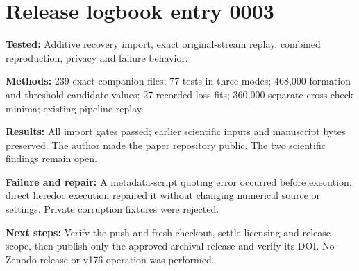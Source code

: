 \section*{Release logbook entry 0003}
\textbf{Tested:} Additive recovery import, exact original-stream replay, combined reproduction, privacy and failure behavior.

\textbf{Methods:} 239 exact companion files; 77 tests in three modes; 468,000 formation and threshold candidate values; 27 recorded-loss fits; 360,000 separate cross-check minima; existing pipeline replay.

\textbf{Results:} All import gates passed; earlier scientific inputs and manuscript bytes preserved. The author made the paper repository public. The two scientific findings remain open.

\textbf{Failure and repair:} A metadata-script quoting error occurred before execution; direct heredoc execution repaired it without changing numerical source or settings. Private corruption fixtures were rejected.

\textbf{Next steps:} Verify the push and fresh checkout, settle licensing and release scope, then publish only the approved archival release and verify its DOI. No Zenodo release or v176 operation was performed.
